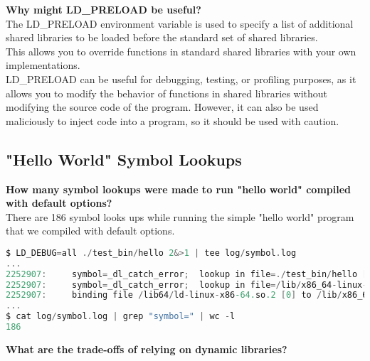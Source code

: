 \documentclass{article}
\begin{document}
\textbf{Why might LD\_PRELOAD be useful?}\\

The LD\_PRELOAD environment variable is used to specify a list of additional shared libraries to be 
loaded before the standard set of shared libraries. \\

This allows you to override functions in standard shared libraries with your own implementations.\\

LD\_PRELOAD can be useful for debugging, testing, or profiling purposes, as it allows you to modify the 
behavior of functions in shared libraries without modifying the source code of the program. 
However, it can also be used maliciously to inject code into a program, so it should be used with caution.\\

\subsection{"Hello World" Symbol Lookups}

\textbf{How many symbol lookups were made to run "hello world" compiled with default options?} \\

    There are 186 symbol looks ups while running the simple "hello world" program that we compiled with 
    default options.\\ 

\begin{lstlisting}[language=C, caption=Symbol Lookups for the simple "hello world" program, basicstyle=\tiny]
$ LD_DEBUG=all ./test_bin/hello 2&>1 | tee log/symbol.log
...
2252907:     symbol=_dl_catch_error;  lookup in file=./test_bin/hello [0]
2252907:     symbol=_dl_catch_error;  lookup in file=/lib/x86_64-linux-gnu/libc.so.6 [0]
2252907:     binding file /lib64/ld-linux-x86-64.so.2 [0] to /lib/x86_64-linux-gnu/libc.so.6 [0]: normal symbol `_dl_catch_error' [GLIBC_PRIVATE]
...
$ cat log/symbol.log | grep "symbol=" | wc -l
186
\end{lstlisting}


\textbf{What are the trade-offs of relying on dynamic libraries?}\\
\end{document}
